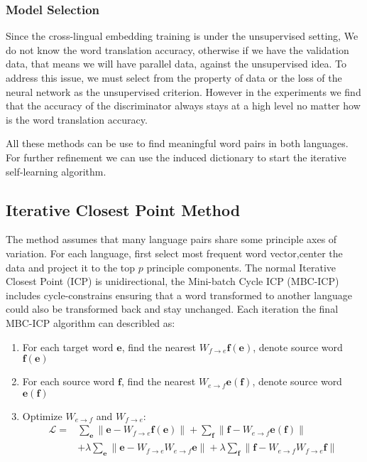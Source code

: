 \subsubsection{Model Selection}
Since the cross-lingual embedding training is under the unsupervised setting, We do not know the word translation accuracy, otherwise if we have the validation data, that means we will have parallel data, against the unsupervised idea. To address this issue, we must select from the property of data or the loss of the neural network as the unsupervised criterion. However in the experiments we find that the accuracy of the discriminator always stays at a high level no matter how is the word translation accuracy. 

All these methods can be use to find meaningful word pairs in both languages. For further refinement we can use the induced dictionary to start the iterative self-learning algorithm. 

\subsection{Iterative Closest Point Method}
The method assumes that many language pairs share some principle axes of variation. For each language, first select most frequent word vector,center the data and project it to the top ${p}$ principle components.
The normal Iterative Closest Point (ICP) is unidirectional, the Mini-batch Cycle ICP (MBC-ICP) includes cycle-constrains ensuring that a word transformed to another language could also be transformed back and stay unchanged. Each iteration the final MBC-ICP algorithm can describled as: 

\begin{enumerate}
	\item For each target word ${\bm{e}}$, find the nearest ${W_{f\rightarrow e} \bm{f(e)}}$, denote source word $\bm{f(e)}$
	\item For each source word ${\bm{f}}$, find the nearest ${W_{e\rightarrow f} \bm{e(f)}}$, denote source word $\bm{e(f)}$
	\item Optimize ${W_{e\rightarrow f}}$ and ${W_{f\rightarrow e}}$: 
	\begin{align*}
	\mathcal{L} = &  \sum_{\bm{e}} {\lVert \bm{e} - W_{f\rightarrow e} \bm{f(e)}\rVert} + \sum_{\bm{f}} {\rVert \bm{f} - W_{e \rightarrow f} \bm{e(f)} \rVert} \\
	& + \lambda \sum_{\bm{e}}{\lVert \bm{e} - W_{f\rightarrow e} W_{e\rightarrow f} \bm{e} \rVert} + \lambda {\sum_{\bm{f}}} {\lVert \bm{f} - W_{e\rightarrow f} W_{f \rightarrow e} \bm{f} \rVert}
	\end{align*}
	
\end{enumerate}
